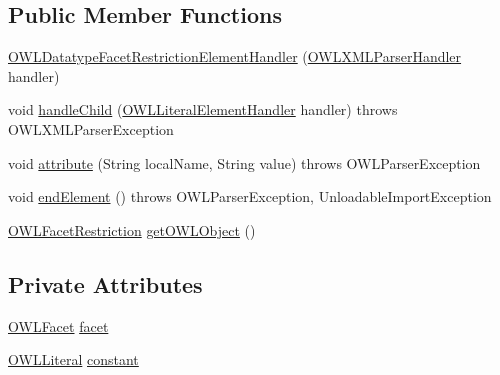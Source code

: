 \subsection*{Public Member Functions}
\begin{DoxyCompactItemize}
\item 
\hyperlink{classorg_1_1coode_1_1owlapi_1_1owlxmlparser_1_1_o_w_l_datatype_facet_restriction_element_handler_a809c8a3f95a144e91b633ce99c781f5b}{O\-W\-L\-Datatype\-Facet\-Restriction\-Element\-Handler} (\hyperlink{classorg_1_1coode_1_1owlapi_1_1owlxmlparser_1_1_o_w_l_x_m_l_parser_handler}{O\-W\-L\-X\-M\-L\-Parser\-Handler} handler)
\item 
void \hyperlink{classorg_1_1coode_1_1owlapi_1_1owlxmlparser_1_1_o_w_l_datatype_facet_restriction_element_handler_a77c90870f2bebdb6f3b304d01be6a629}{handle\-Child} (\hyperlink{classorg_1_1coode_1_1owlapi_1_1owlxmlparser_1_1_o_w_l_literal_element_handler}{O\-W\-L\-Literal\-Element\-Handler} handler)  throws O\-W\-L\-X\-M\-L\-Parser\-Exception 
\item 
void \hyperlink{classorg_1_1coode_1_1owlapi_1_1owlxmlparser_1_1_o_w_l_datatype_facet_restriction_element_handler_a2f88f6b0b5906dc7ed70b2f755aedbfb}{attribute} (String local\-Name, String value)  throws O\-W\-L\-Parser\-Exception 
\item 
void \hyperlink{classorg_1_1coode_1_1owlapi_1_1owlxmlparser_1_1_o_w_l_datatype_facet_restriction_element_handler_a2beb8a6dbfd8fd12dc2d312bd64f7306}{end\-Element} ()  throws O\-W\-L\-Parser\-Exception, Unloadable\-Import\-Exception 
\item 
\hyperlink{interfaceorg_1_1semanticweb_1_1owlapi_1_1model_1_1_o_w_l_facet_restriction}{O\-W\-L\-Facet\-Restriction} \hyperlink{classorg_1_1coode_1_1owlapi_1_1owlxmlparser_1_1_o_w_l_datatype_facet_restriction_element_handler_a2821126fd55d408bbd23665caa1a544c}{get\-O\-W\-L\-Object} ()
\end{DoxyCompactItemize}
\subsection*{Private Attributes}
\begin{DoxyCompactItemize}
\item 
\hyperlink{enumorg_1_1semanticweb_1_1owlapi_1_1vocab_1_1_o_w_l_facet}{O\-W\-L\-Facet} \hyperlink{classorg_1_1coode_1_1owlapi_1_1owlxmlparser_1_1_o_w_l_datatype_facet_restriction_element_handler_a96127c4820c2a89f48ab6dcc74f73098}{facet}
\item 
\hyperlink{interfaceorg_1_1semanticweb_1_1owlapi_1_1model_1_1_o_w_l_literal}{O\-W\-L\-Literal} \hyperlink{classorg_1_1coode_1_1owlapi_1_1owlxmlparser_1_1_o_w_l_datatype_facet_restriction_element_handler_a9baf78c10797d35783aeae3b53fa47d1}{constant}
\end{DoxyCompactItemize}


